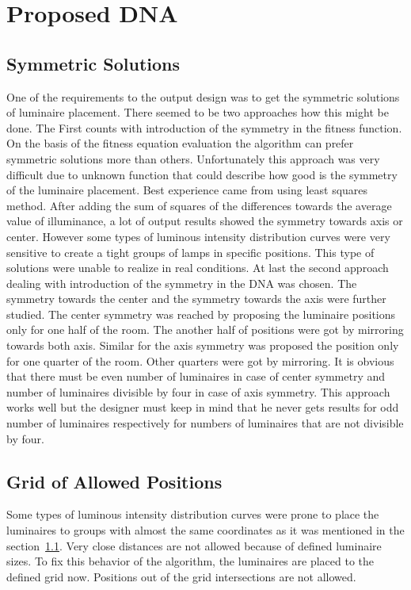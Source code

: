 \section{Proposed DNA}
\subsection{Symmetric Solutions}
\label{ssec:symmetry}
One of the requirements to the output design was to get the symmetric solutions of luminaire placement. There seemed to be two approaches how this might be done. The First counts with introduction of the symmetry in the fitness function. On the basis of the fitness equation evaluation the algorithm can prefer symmetric solutions more than others. Unfortunately this approach was very difficult due to unknown function that could describe how good is the symmetry of the luminaire placement. Best experience came from using least squares method. After adding the sum of squares of the differences towards the average value of illuminance, a lot of output results showed the symmetry towards axis or center. However some types of luminous intensity distribution curves were very sensitive to create a tight groups of lamps in specific positions. This type of solutions were unable to realize in real conditions.
At last the second approach dealing with introduction of the symmetry in the DNA was chosen. The symmetry towards the center and the symmetry towards the axis were further studied. The center symmetry was reached by proposing the luminaire positions only for one half of the room. The another half of positions were got by mirroring towards both axis. Similar for the axis symmetry was proposed the position only for one quarter of the room. Other quarters were got by mirroring. It is obvious that there must be even number of luminaires in case of center symmetry and number of luminaires divisible by four in case of axis symmetry. This approach works well but the designer must keep in mind that he never gets results for odd number of luminaires respectively for numbers of luminaires that are not divisible by four.

\subsection{Grid of Allowed Positions}
\label{ssec:grid}
Some types of luminous intensity distribution curves were prone to place the luminaires to groups with almost the same coordinates as it was mentioned in the section~\ref{ssec:symmetry}. Very close distances are not allowed because of defined luminaire sizes. To fix this behavior of the algorithm, the luminaires are placed to the defined grid now. Positions out of the grid intersections are not allowed.

